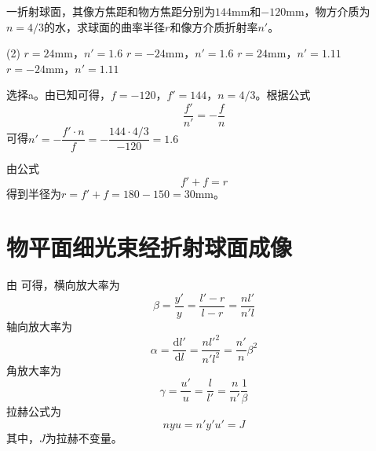 \documentclass[cn,10pt,chinesefont=founder,math=newtx,cite=super,twoside]{elegantbook}
\begin{document}
\begin{problem}
	一折射球面，其像方焦距和物方焦距分别为$144\mathrm{mm}$和$-120\mathrm{mm}$，物方介质为$n=4/3$的水，求球面的曲率半径$r$和像方介质折射率$n'$。
	\begin{tasks}(2)
		\task $r=24\mathrm{mm}$，$n'=1.6$
		\task $r=-24\mathrm{mm}$，$n'=1.6$
		\task $r=24\mathrm{mm}$，$n'=1.11$
		\task $r=-24\mathrm{mm}$，$n'=1.11$
	\end{tasks}
\end{problem}
\begin{solution}
	选择a。由已知可得，$f=-120$，$f'=144$，$n=4/3$。根据公式
	\begin{equation}
	\frac{f'}{n'}=-\frac{f}{n}
	\end{equation}
	可得$n'=-\dfrac{f'\cdot n}{f}=-\dfrac{144\cdot 4/3}{-120}=1.6$
	
	由公式
	\begin{equation}
	f'+f=r
	\end{equation}
	得到半径为$r=f'+f=180-150=30\mathrm{mm}$。
\end{solution}

\section{物平面细光束经折射球面成像}
\label{sect:three-magnification}
由 可得，横向放大率为
\begin{equation}
\beta=\frac{y'}{y}=\frac{l'-r}{l-r}=\frac{nl'}{n'l}
\end{equation}
轴向放大率为
\begin{equation}
\alpha=\frac{\mathrm{d}l'}{\mathrm{d}l}=\frac{nl'^2}{n'l^2}=\frac{n'}{n}\beta^2
\end{equation}
角放大率为
\begin{equation}
\gamma=\frac{u'}{u}=\frac{l}{l'}=\frac{n}{n'}\frac{1}{\beta}
\end{equation}
拉赫公式为
\begin{equation}
nyu=n'y'u'=J
\end{equation}
其中，$J$为拉赫不变量。
\end{document}
